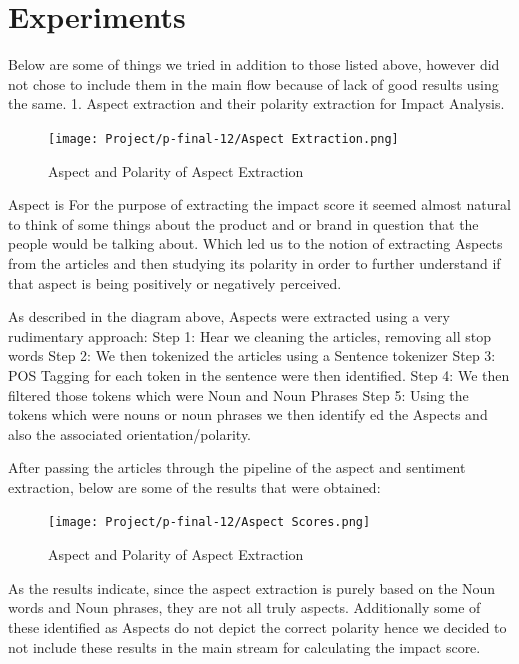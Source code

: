\documentclass[paper=a4, fontsize=11pt]{scrartcl}
\numberwithin{equation}{section}		%
\numberwithin{figure}{section}			%
\numberwithin{table}{section}				%
\begin{document}
\section{Experiments}
Below are some of things we tried in addition to those listed above, however did not chose to include them in the main flow because of lack of good results using the same.
1. Aspect extraction and their polarity extraction for Impact Analysis. 
\begin{figure}
	\centering
 	 \texttt{[image: Project/p-final-12/Aspect Extraction.png]}
	  \caption{Aspect and Polarity of Aspect Extraction}
 	 \label{fig:Aspect Extraction.png}
\end{figure}
Aspect is 
For the purpose of extracting the impact score it seemed almost natural to think of some things about the product and or brand in question that the people would be talking about. Which led us to the notion of extracting Aspects from the articles and then studying its polarity in order to further understand if that aspect is being positively or negatively perceived.

As described in the diagram above, Aspects were extracted using a very rudimentary approach: 
{Step 1: Hear we cleaning the articles, removing all stop words}
{Step 2: We then tokenized the articles using a Sentence tokenizer}
{Step 3: POS Tagging for each token in the sentence were then identified.}  
{Step 4: We then filtered those tokens which were Noun and Noun Phrases}
{Step 5: Using the tokens which were nouns or noun phrases we then identify ed the Aspects and also the associated orientation/polarity.}

{After passing the articles through the pipeline of the aspect and sentiment extraction, below are some of the results that were obtained:}

\begin{figure}
	\centering
 	 \texttt{[image: Project/p-final-12/Aspect Scores.png]}
	  \caption{Aspect and Polarity of Aspect Extraction}
 	 \label{fig:Aspect Extraction.png}
\end{figure}

As the results indicate, since the aspect extraction is purely based on the Noun words and Noun phrases, they are not all truly aspects. 
Additionally some of these identified as Aspects do not depict the correct polarity hence we decided to not include these results in the main stream for calculating the impact score.
\end{document}
